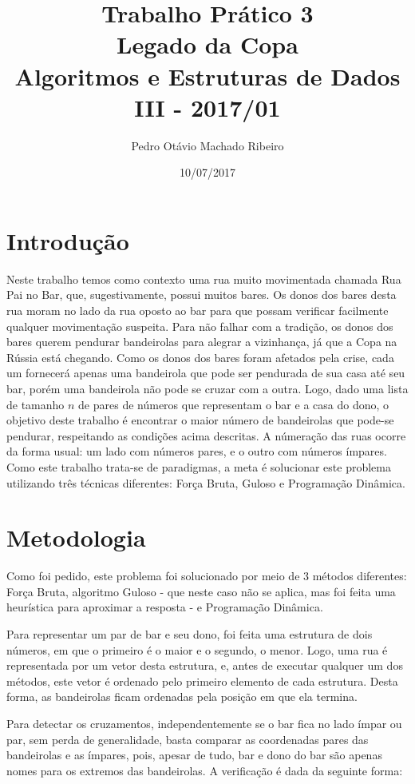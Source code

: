 \documentclass[
	12pt,
	a4paper,
	onepage,
	brazil
]{article}
\author{Pedro Otávio Machado Ribeiro}
\title{Trabalho Prático 3\\Legado da Copa
	\\Algoritmos e Estruturas de Dados III - 2017/01}
\date{10/07/2017}
\begin{document}
	\maketitle
	
	\section{Introdução}
	
	Neste trabalho temos como contexto uma rua muito movimentada chamada Rua Pai no Bar, que, sugestivamente, possui muitos bares. Os donos dos bares desta rua moram no lado da rua oposto ao bar para que possam verificar facilmente qualquer movimentação suspeita. Para não falhar com a tradição, os donos dos bares querem pendurar bandeirolas para alegrar a vizinhança, já que a Copa na Rússia está chegando. Como os donos dos bares foram afetados pela crise, cada um fornecerá apenas uma bandeirola que pode ser pendurada de sua casa até seu bar, porém uma bandeirola não pode se cruzar com a outra. Logo, dado uma lista de tamanho $n$ de pares de números que representam o bar e a casa do dono, o objetivo deste trabalho é encontrar o maior número de bandeirolas que pode-se pendurar, respeitando as condições acima descritas. A númeração das ruas ocorre da forma usual: um lado com números pares, e o outro com números ímpares. Como este trabalho trata-se de paradigmas, a meta é solucionar este problema utilizando três técnicas diferentes: Força Bruta, Guloso e Programação Dinâmica.
	
	\section{Metodologia}
	
	Como foi pedido, este problema foi solucionado por meio de 3 métodos diferentes: Força Bruta, algoritmo Guloso - que neste caso não se aplica, mas foi feita uma heurística para aproximar a resposta - e Programação Dinâmica.
	
	Para representar um par de bar e seu dono, foi feita uma estrutura de dois números, em que o primeiro é o maior e o segundo, o menor. Logo, uma rua é representada por um vetor desta estrutura, e, antes de executar qualquer um dos métodos, este vetor é ordenado pelo primeiro elemento de cada estrutura. Desta forma, as bandeirolas ficam ordenadas pela posição em que ela termina.
	
	Para detectar os cruzamentos, independentemente se o bar fica no lado ímpar ou par, sem perda de generalidade, basta comparar as coordenadas pares das bandeirolas e as ímpares, pois, apesar de tudo, bar e dono do bar são apenas nomes para os extremos das bandeirolas. A verificação é dada da seguinte forma:
	
\end{document}
